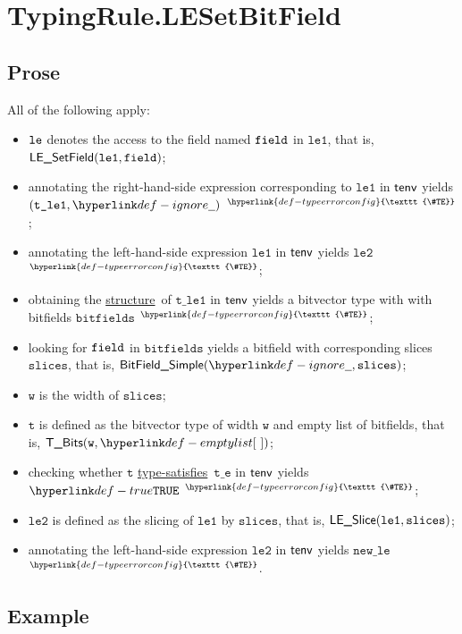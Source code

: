 \documentclass{book}
\newcommand\TypeErrorConfig[0]{\hyperlink{def-typeerrorconfig}{\texttt{\#TE}}}
\newcommand\ProseOrTypeError[0]{\hyperlink{def-proseortypeerror}{$^{\TypeErrorConfig}$}}
\newcommand\structure[0]{\hyperlink{def-structure}{structure}}
\newcommand\typesatisfies[0]{\hyperlink{def-typesatisfies}{type-satisfies}}
\newcommand\vt[0]{\texttt{t}}
\newcommand\vte[0]{\texttt{t\_e}}
\newcommand\vleone[0]{\texttt{le1}}
\newcommand\vletwo[0]{\texttt{le2}}
\newcommand\vtleone[0]{\texttt{t\_le1}}
\newcommand\vw[0]{\texttt{w}}
\newcommand\bitfields[0]{\texttt{bitfields}}
\newcommand\newle[0]{\texttt{new\_le}}
\newcommand\slices[0]{\texttt{slices}}
\begin{document}

\section{TypingRule.LESetBitField \label{sec:TypingRule.LESetBitField}}

\subsection{Prose}
All of the following apply:
\begin{itemize}
\item $\texttt{le}$ denotes the access to the field named $\texttt{field}$ in $\vleone$, that is, \\ $\LESetField(\vleone, \field)$;
\item annotating the right-hand-side expression corresponding to $\vleone$ in $\textsf{tenv}$ yields \\ $(\vtleone, \Ignore)$ \ProseOrTypeError;
\item annotating the left-hand-side expression $\vleone$ in $\textsf{tenv}$ yields $\vletwo$ \ProseOrTypeError;
\item obtaining the \structure\ of $\vtleone$ in $\textsf{tenv}$ yields a bitvector type with with bitfields $\bitfields$ \ProseOrTypeError;
\item looking for $\texttt{field}$ in $\bitfields$ yields a bitfield with corresponding slices $\slices$, that is, $\BitFieldSimple(\Ignore, \slices)$;
\item $\vw$ is the width of $\slices$;
\item $\vt$ is defined as the bitvector type of width $\vw$ and empty list of bitfields, that is, $\TBits(\vw, \emptylist)$;
\item checking whether $\vt$ \typesatisfies\ $\vte$ in $\textsf{tenv}$ yields $\True$ \ProseOrTypeError;
\item $\vletwo$ is defined as the slicing of $\vleone$ by $\slices$, that is, $\LESlice(\vleone, \slices)$;
\item annotating the left-hand-side expression $\vletwo$ in $\textsf{tenv}$ yields $\newle$ \ProseOrTypeError.
\end{itemize}

\subsection{Example}
\end{document}
